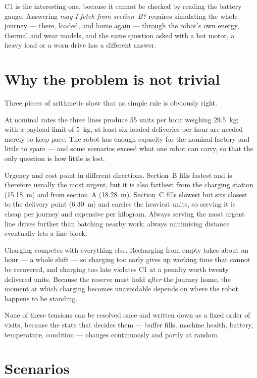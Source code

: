 C1 is the interesting one, because it cannot be checked by reading the battery gauge. Answering
\emph{may I fetch from section~B?} requires simulating the whole journey --- there, loaded, and home
again --- through the robot's own energy, thermal and wear models, and the same question asked with
a hot motor, a heavy load or a worn drive has a different answer.

\section{Why the problem is not trivial}
\label{sec:why-hard}

Three pieces of arithmetic show that no simple rule is obviously right.

At nominal rates the three lines produce \num{55} units per hour weighing
\SI{29.5}{\kilo\gram}; with a payload limit of \SI{5}{\kilo\gram}, at least six loaded deliveries
per hour are needed merely to keep pace. The robot has enough capacity for the nominal factory and
little to spare --- and some scenarios exceed what one robot can carry, so that the only question
is how little is lost.

Urgency and cost point in different directions. Section~B fills fastest and is therefore usually
the most urgent, but it is also farthest from the charging station (\SI{15.18}{\metre}) and from
section~A (\SI{18.28}{\metre}). Section~C fills slowest but sits closest to the delivery point
(\SI{6.30}{\metre}) and carries the heaviest units, so serving it is cheap per journey and
expensive per kilogram. Always serving the most urgent line drives further than batching nearby
work; always minimising distance eventually lets a line block.

Charging competes with everything else. Recharging from empty takes about an hour --- a whole shift
--- so charging too early gives up working time that cannot be recovered, and charging too late
violates C1 at a penalty worth twenty delivered units. Because the reserve must hold \emph{after}
the journey home, the moment at which charging becomes unavoidable depends on where the robot
happens to be standing.

None of these tensions can be resolved once and written down as a fixed order of visits, because
the state that decides them --- buffer fills, machine health, battery, temperature, condition ---
changes continuously and partly at random.

\section{Scenarios}
\label{sec:scenarios}

